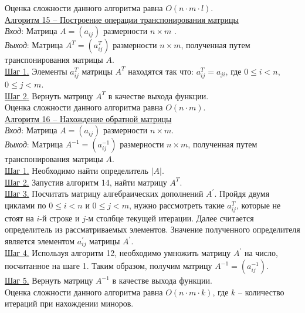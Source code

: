 \documentclass[bachelor, och, labwork]{shiza}
\begin{document}
            Оценка сложности данного алгоритма равна $O(n \cdot m \cdot l)$.\\

    
        \underline{Алгоритм 15 -- Построение операции транспонирования матрицы}\\
            \textit{Вход}: Матрица $A = (a_{ij})$ размерности $n \times m$ .\\
            \textit{Выход}: Матрица $A^T = (a^{T}_{ij})$ размерности $n \times m$, полученная путем транспонирования матрицы $A$.\\
            \underline{Шаг 1.} Элементы $a^T_{ij}$ матрицы $A^T$ находятся так что: $a^T_{ij} = a_{ji}$, где $0 \leq i < n$, $0 \leq j < m$. \\
            \underline{Шаг 2.} Вернуть матрицу $A^T$ в качестве выхода функции.\\
        
            Оценка сложности данного алгоритма равна $O(n \cdot m)$.\\

        \underline{Алгоритм 16 -- Нахождение обратной матрицы}\\
            \textit{Вход}: Матрица $A = (a_{ij})$ размерности $n \times m$.\\
            \textit{Выход}: Матрица $A^{-1} = (a^{-1}_{ij})$ размерности $n \times m$, полученная путем транспонирования матрицы $A$.\\
            \underline{Шаг 1.} Необходимо найти определитель $|A|$.\\
            \underline{Шаг 2.} Запустив алгоритм 14, найти матрицу $A^T$.\\
            \underline{Шаг 3.} Посчитать матрицу алгебраических дополнений $A^{'}$. Пройдя двумя циклами по $0 \leq i < n$ и $0 \leq j < m$, нужно
            рассмотреть такие $a^T_{ij}$, которые не стоят на $i$-й строке и $j$-м столбце текущей итерации. Далее считается определитель из рассматриваемых
            элементов. Значение полученного определителя является элементом $a^{'}_{ij}$ матрицы $A^{'}$.\\
            \underline{Шаг 4.} Используя алгоритм 12, необходимо умножить матрицу $A^{'}$ на число, посчитанное на шаге 1. Таким образом, получим матрицу
            $A^{-1} = (a^{-1}_{ij})$.\\
            \underline{Шаг 5.} Вернуть матрицу $A^{-1}$ в качестве выхода функции.\\

            Оценка сложности данного алгоритма равна $O(n \cdot m \cdot k)$, где $k$ -- количество итераций при нахождении миноров.\\
\end{document}

